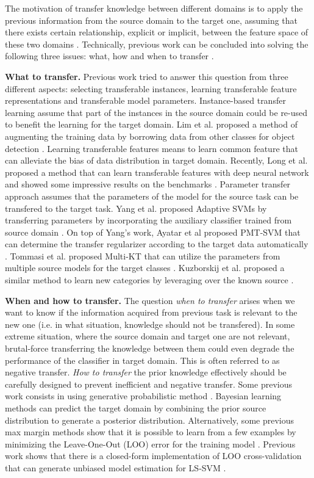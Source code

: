 The motivation of transfer knowledge between different domains is to apply the previous information from the source domain to the target one, assuming that there exists certain relationship, explicit or implicit, between the  feature space of these two domains \cite{pan2010survey}. Technically, previous work can be concluded into solving the following three issues: what, how and when to transfer \cite{tommasi2014learning}.


\textbf{What to transfer.} Previous work tried to answer this question from three different aspects: selecting transferable instances, learning transferable feature representations and transferable model parameters. Instance-based transfer learning assume that part of the instances in the source domain could be re-used to benefit the learning for the target domain. Lim et al. proposed a method of augmenting the training data by borrowing data from other classes for object detection \cite{lim2012transfer}. Learning transferable features means to learn common feature that can alleviate the bias of data distribution in target domain. Recently, Long et al. proposed a method that can learn transferable features with deep neural network and showed some impressive results on the  benchmarks \cite{LongICML15}. Parameter transfer
approach assumes that the parameters of the model for the source task can be transfered to the target task. Yang et al. proposed Adaptive SVMs by transferring parameters by incorporating the auxiliary classifier trained from source domain \cite{yang2007cross}. On top of Yang's work, Ayatar et al proposed PMT-SVM that can determine the transfer regularizer according to the target data automatically \cite{aytar2011tabula}. Tommasi et al. proposed Multi-KT that can utilize the parameters from multiple source models for the target classes  \cite{tommasi2014learning}.
Kuzborskij et al. proposed a similar method to learn new categories by leveraging over the known source \cite{kuzborskij2013n}.

\textbf{When and how to transfer.} The question \textit{when to transfer} arises when we want to know if the information acquired from previous task is relevant to the new one (i.e. in what situation, knowledge should not be transfered). In some extreme situation, where the source domain and target one are not relevant, brutal-force transferring the knowledge between them could even degrade the performance of the classifier in target domain. This is often referred to as negative transfer. \textit{How to transfer} the prior knowledge effectively should be carefully designed to prevent inefficient and negative transfer. Some previous work consists in using generative probabilistic method \cite{davis2009deep} \cite{wang2014active} \cite{zhou2014multi}.  Bayesian learning methods can predict the target domain by combining the prior source distribution to generate a posterior distribution. Alternatively, some previous max margin methods show that it is possible to learn from a few examples by minimizing the  Leave-One-Out (LOO) error for the training model \cite{kuzborskij2013n} \cite{tommasi2010safety}. Previous work shows that there is a closed-form implementation of LOO cross-validation that can generate unbiased model estimation for LS-SVM \cite{cawley2006leave}.

